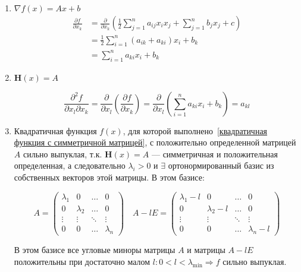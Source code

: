 \begin{prop}\itemfix
    \begin{enumerate}
        \item \(\nabla f(x) = Ax + b\)
              \begin{align*}
                  \frac{\partial f}{\partial x_k} & = \frac{\partial}{\partial x_k} \left( \frac{1}{2} \sum_{j = 1}^n a_{ij} x_i x_j + \sum_{j = 1}^n b_j x_j + c \right) \\
                                                  & = \frac{1}{2} \sum_{i = 1}^n (a_{ik} + a_{ki}) x_i + b_k                                                              \\
                                                  & = \sum_{i = 1}^n a_{ki} x_i + b_k
              \end{align*}

        \item \(\mathbf H(x) = A\)

              \[\frac{\partial^2 f}{\partial x_l \partial x_k} = \frac{\partial}{\partial x_l} \left( \frac{\partial f}{\partial x_k} \right) = \frac{\partial}{\partial x_l} \left( \sum_{i = 1}^n a_{ki} x_i + b_k \right) = a_{kl}\]

        \item Квадратичная функция \(f(x)\), для которой выполнено~\eqref{квадратичная функция с симметричной матрицей}, с положительно определенной матрицей \(A\) сильно выпуклая, т.к. \(\mathbf H(x) = A\) --- симметричная и положительная определенная, а следовательно \(\lambda_i > 0\) и \(\exists \) ортонормированный базис из собственных векторов этой матрицы. В этом базисе:

              \[A = \begin{pmatrix}
                      \lambda_1 & 0         & \dots  & 0         \\
                      0         & \lambda_2 & \dots  & 0         \\
                      \vdots    & \vdots    & \ddots & \vdots    \\
                      0         & 0         & \dots  & \lambda_n
                  \end{pmatrix} \quad A - lE = \begin{pmatrix}
                      \lambda_1 - l & 0             & \dots  & 0             \\
                      0             & \lambda_2 - l & \dots  & 0             \\
                      \vdots        & \vdots        & \ddots & \vdots        \\
                      0             & 0             & \dots  & \lambda_n - l
                  \end{pmatrix}\]

              В этом базисе все угловые миноры матрицы \(A\) и матрицы \(A - lE\) положительны при достаточно малом \(l : 0 < l < \lambda_{\min} \Rightarrow f\) сильно выпуклая.
    \end{enumerate}
\end{prop}

